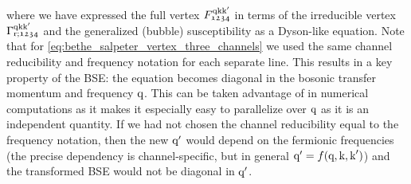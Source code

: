 \documentclass[../../main.tex]{subfiles}
\begin{document}
where we have expressed the full vertex $F_{\mathfrak{1234}}^{\text{q}\text{k}\text{k}'}$ in terms of the irreducible vertex $\Gamma_{\text{r};\mathfrak{1234}}^{\text{q}\text{k}\text{k}'}$ and the generalized (bubble) susceptibility as a Dyson-like equation. Note that for \eqref{eq:bethe_salpeter_vertex_three_channels} we used the same channel reducibility and frequency notation for each separate line. This results in a key property of the BSE: the equation becomes diagonal in the bosonic transfer momentum and frequency $\text{q}$. This can be taken advantage of in numerical computations as it makes it especially easy to parallelize over $\text{q}$ as it is an independent quantity. If we had not chosen the channel reducibility equal to the frequency notation, then the new $\text{q}'$ would depend on the fermionic frequencies (the precise dependency is channel-specific, but in general $\text{q}'=f(\text{q},\text{k},\text{k}')$) and the transformed BSE would not be diagonal in $\text{q}'$. 
\end{document}
